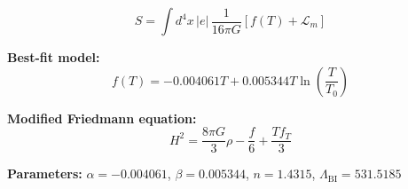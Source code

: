 
\begin{equation}
  S = \int d^4x \, |e| \, \frac{1}{16\pi G} \left[ f(T) + \mathcal{L}_m \right]
\end{equation}

\textbf{Best-fit model:}
\begin{equation}
  f(T) = -0.004061 T + 0.005344 T \ln\!\left(\frac{T}{T_0}\right)
\end{equation}

\textbf{Modified Friedmann equation:}
\begin{equation}
  H^2 = \frac{8\pi G}{3} \rho - \frac{f}{6} + \frac{T f_T}{3}
\end{equation}

\textbf{Parameters:}
$\alpha = -0.004061$, \quad
$\beta = 0.005344$, \quad
$n = 1.4315$, \quad
$\Lambda_{\text{BI}} = 531.5185$